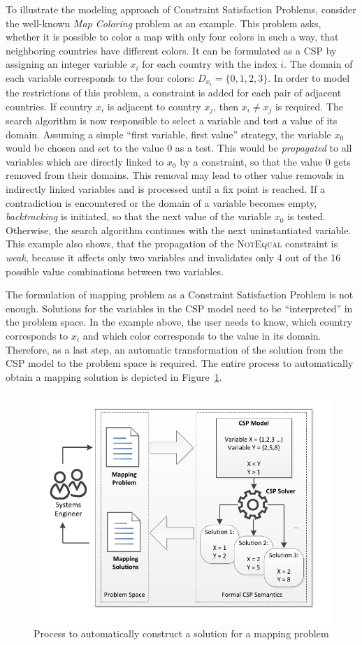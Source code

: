 \documentclass[english,biblatex]{lni}
\begin{document}
To illustrate the modeling approach of Constraint Satisfaction Problems, consider the well-known \emph{Map Coloring} problem as an example.
This problem asks, whether it is possible to color a map with only four colors in such a way, that neighboring countries have different colors.
It can be formulated as a CSP by assigning an integer variable $x_i$ for each country with the index $i$.
The domain of each variable corresponds to the four colors: $D_{x_i}=\{0,1,2,3\}$.
In order to model the restrictions of this problem, a constraint is added for each pair of adjacent countries.
If country $x_i$ is adjacent to country $x_j$, then $x_i \neq x_j$ is required.
The search algorithm is now responsible to select a variable and test a value of its domain.
Assuming a simple ``first variable, first value'' strategy, the variable $x_0$ would be chosen and set to the value $0$ as a test.
This would be \emph{propagated} to all variables which are directly linked to $x_0$ by a constraint, so that the value $0$ gets removed from their domains.
This removal may lead to other value removals in indirectly linked variables and is processed until a fix point is reached.
If a contradiction is encountered or the domain of a variable becomes empty, \emph{backtracking} is initiated, so that the next value of the variable $x_0$ is tested.
Otherwise, the search algorithm continues with the next uninstantiated variable.
This example also shows, that the propagation of the \textsc{NotEqual} constraint is \emph{weak}, because it affects only two variables and invalidates only 4 out of the 16 possible value combinations between two variables.

The formulation of mapping problem as a Constraint Satisfaction Problem is not enough. 
Solutions for the variables in the CSP model need to be ``interpreted'' in the problem space.
In the example above, the user needs to know, which country corresponds to $x_i$ and which color corresponds to the value in its domain.
Therefore, as a last step, an automatic transformation of the solution from the CSP model to the problem space is required.
The entire process to automatically obtain a mapping solution is depicted in Figure~\ref{fig:assist-process}.

\begin{figure}[htbp]
  \includegraphics[width=.5\textwidth]{assist-process}
  \caption{Process to automatically construct a solution for a mapping problem}\label{fig:assist-process}
\end{figure}
\end{document}
